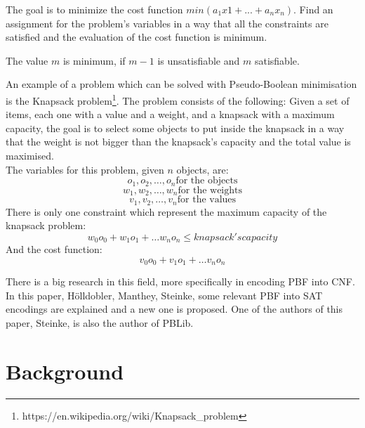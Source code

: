 The goal is to minimize the cost function $min(a_{1}x{1} + ... + a_{n}x_{n})$. Find an assignment for the problem’s variables in a way that all the constraints are satisfied and the evaluation of the cost function is minimum.  

The value $m$ is minimum, if $m-1$ is unsatisfiable and $m$ satisfiable.  

An example of a problem which can be solved with Pseudo-Boolean minimisation is the Knapsack problem\footnote{https://en.wikipedia.org/wiki/Knapsack\_problem}.
The problem consists of the following: Given a set of items, each one with a value and a weight, and a knapsack with a maximum capacity, the goal is to select some objects to put inside the knapsack in a way that the weight is not bigger than the knapsack's capacity and the total value is maximised. \\

The variables for this problem, given $n$ objects, are:
$$o_1, o_2, \ldots , o_n \text{for the objects}$$
$$w_1, w_2, \ldots , w_n \text{for the weights}$$
$$v_1, v_2, \ldots , v_n \text{for the values}$$
There is only one constraint which represent the maximum capacity of the knapsack problem:
$$w_0 o_0 + w_1 o_1+  \ldots w_n o_n \leq knapsack's capacity$$
And the cost function:
$$v_0 o_0 + v_1 o_1+  \ldots v_n o_n $$



There is a big research in this field, more specifically in encoding PBF into CNF. In this paper, Hölldobler, Manthey, Steinke\cite{Holldobler}, some relevant PBF into SAT encodings are explained and a new one is proposed. One of the authors of this paper, Steinke, is also the author of PBLib. 
 

\section{Background}

